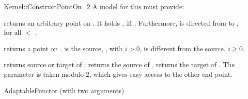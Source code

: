 \begin{ccRefFunctionObjectConcept}{Kernel::ConstructPointOn_2}
A model for this must provide:


       {returns an arbitrary point on . It holds 
        , iff .
        Furthermore,  is directed from 
        to , for all  $<$ .}

       {returns a point on .  is the source,
        , with $i>0$, is different from the 
        source. \ccPrecond $i \geq 0$.}

       {returns source or target   of :    returns
        the source of ,  returns the target of .
        The parameter  is taken modulo 2, which gives 
        easy access to the other end point. }

\ccRefines
AdaptableFunctor (with two arguments)

\ccSeeAlso
{} \\
 \\
 \\

\end{ccRefFunctionObjectConcept}
